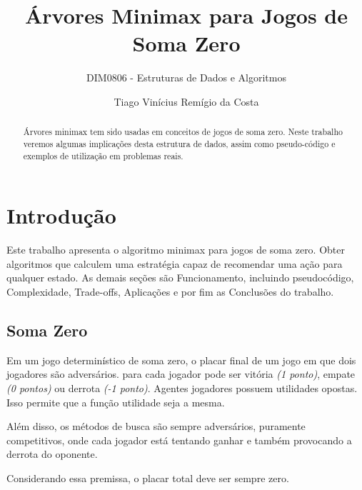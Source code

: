 \documentclass[sigplan,screen]{acmart}
\begin{document}
\title{Árvores Minimax para Jogos de Soma Zero}
\subtitle{DIM0806 - Estruturas de Dados e Algoritmos}

\author{Tiago Vinícius Remígio da Costa}

\begin{abstract}
  Árvores minimax tem sido usadas em conceitos de jogos de soma zero. 
  Neste trabalho veremos algumas implicações desta estrutura de dados, 
  assim como pseudo-código e exemplos de utilização em problemas reais.
\end{abstract}


\maketitle
\pagestyle{plain}

\section{Introdução}
Este trabalho apresenta o algoritmo minimax para jogos de soma zero. 
Obter algoritmos que calculem uma estratégia capaz de recomendar uma ação para qualquer estado.
As demais seções são Funcionamento, incluindo pseudocódigo, Complexidade, Trade-offs, Aplicações e por fim as Conclusões do trabalho.

\subsection{Soma Zero}
Em um jogo determinístico de soma zero, o placar final de um jogo em que dois jogadores são adversários.
para cada jogador pode ser vitória {\itshape(1 ponto)}, empate {\itshape(0 pontos)} ou derrota {\itshape(-1 ponto)}. 
Agentes jogadores possuem utilidades opostas. Isso permite que a função utilidade seja a mesma.

Além disso, os métodos de busca são sempre adversários, puramente competitivos, onde cada jogador está tentando ganhar e também provocando a derrota do oponente.

Considerando essa premissa, o placar total deve ser sempre zero.
\end{document}
